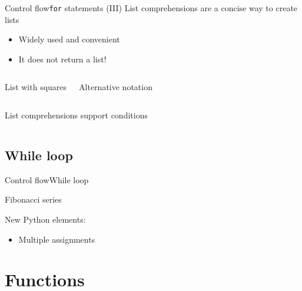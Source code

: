 \documentclass[10pt,compress]{beamer} %
\begin{document}
\begin{frame}{Control flow}{\texttt{for} statements (III)}
	List comprehensions are a concise way to create lists
	\begin{itemize}
		\item Widely used and convenient
        \item It does not return a list!
	\end{itemize}

    \begin{columns}
		\begin{exampleblock}{List with squares}
		
		\end{exampleblock}
		
		\begin{exampleblock}{Alternative notation}
		
		\end{exampleblock}
	\end{columns}

    \bigskip

    List comprehensions support conditions

    \begin{columns}
		\begin{exampleblock}{}
		
		\end{exampleblock}
    \end{columns}
\end{frame}

\subsection{While loop}
\begin{frame}{Control flow}{While loop}
	\begin{exampleblock}{Fibonacci series}
	\vspace{-0.2cm}
		
	\end{exampleblock}

    New Python elements:
	\begin{itemize}
	\item Multiple assignments
	\end{itemize}
\end{frame}


\section{Functions}
\end{document}
